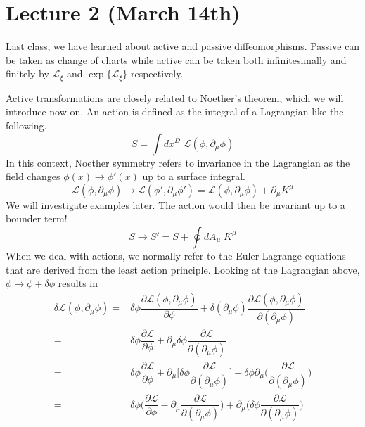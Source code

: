 \section{Lecture 2 (March 14th)}
\begin{recall}
Last class, we have learned about active and passive diffeomorphisms. Passive can be taken as change of charts while active can be taken both infinitesimally and finitely by $\mathcal{L}_{\xi}$ and $\exp\{\mathcal{L}_{\xi }\}$ respectively.
\end{recall}
\vspace{2ex}
\begin{defi}
Active transformations are closely related to Noether's theorem, which we will introduce now on. An action is defined as the integral of a Lagrangian like the following.
\[S=\int dx^{D}\;\mathcal{L}(\phi ,\partial _{\mu }\phi )\]
In this context, Noether symmetry refers to invariance in the Lagrangian as the field changes $\phi (x)\rightarrow \phi '(x)$ up to a surface integral.
\[\mathcal{L}(\phi ,\partial _{\mu }\phi )\rightarrow \mathcal{L}(\phi',\partial _{\mu }\phi ')=\mathcal{L}(\phi ,\partial _{\mu }\phi )+\partial _{\mu }K^{\mu }\]
We will investigate examples later. The action would then be invariant up to a bounder term!
\[S\rightarrow S'=S+\oint dA_{\mu }\;K^{\mu }\]
When we deal with actions, we normally refer to the Euler-Lagrange equations that are derived from the least action principle. Looking at the Lagrangian above, $\phi \rightarrow \phi +\delta \phi $ results in 
\begin{align*}
\delta \mathcal{L}(\phi ,\partial _{\mu }\phi )=&\delta \phi \dfrac{\partial \mathcal{L}(\phi ,\partial _{\mu }\phi )}{\partial \phi }+\delta (\partial _{\mu }\phi ) \dfrac{\partial \mathcal{L}(\phi ,\partial _{\mu }\phi )}{\partial (\partial _{\mu }\phi) }\\
=&\delta \phi \dfrac{\partial \mathcal{L}}{\partial \phi }+\partial _{\mu }\delta \phi \dfrac{\partial \mathcal{L}}{\partial( \partial _{\mu }\phi )}\\
=&\delta \phi \dfrac{\partial \mathcal{L}}{\partial \phi }+\partial _{\mu }\Big[\delta \phi \dfrac{\partial \mathcal{L}}{\partial( \partial _{\mu }\phi )} \Big]-\delta \phi \partial _{\mu }\Big(\dfrac{\partial \mathcal{L}}{\partial (\partial _{\mu }\phi )} \Big)\\
=&\delta \phi \Big(\dfrac{\partial \mathcal{L}}{\partial \phi }-\partial _{\mu }\dfrac{\partial \mathcal{L}}{\partial (\partial _{\mu }\phi )}  \Big)+\partial _{\mu }\Big(\delta \phi \dfrac{\partial \mathcal{L}}{\partial (\partial _{\mu }\phi )} \Big)

\end{align*}
\end{defi}
